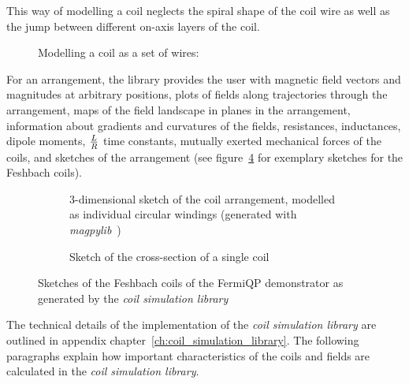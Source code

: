 This way of modelling a coil neglects the spiral shape of the coil wire as well as the jump between different on-axis layers of the coil.

\begin{figure}
    \caption{Modelling a coil as a set of wires:
    }
    \label{fig:coil_model}
\end{figure}

For an arrangement, the library provides the user with magnetic field vectors and magnitudes at arbitrary positions, plots of fields along trajectories through the arrangement, maps of the field landscape in planes in the arrangement, information about gradients and curvatures of the fields, resistances, inductances, dipole moments, $L\over R$ time constants, mutually exerted mechanical forces of the coils, and sketches of the arrangement (see figure~\ref{fig:csl_sketches} for exemplary sketches for the Feshbach coils).

\begin{figure}
    \centering
    \begin{subfigure}[t]{0.47\textwidth}
        \centering
        \resizebox{\textwidth}{!}{
            \begin{pgfpicture}
                \pgftext{}
            \end{pgfpicture}
        }
        \caption{3-dimensional sketch of the coil arrangement, modelled as individual circular windings (generated with \textit{magpylib}~\cite{noauthor_magpylibmagpylib_2022})}
        \label{fig:csl_sketches_3d}
    \end{subfigure}
    \hspace{0.04\textwidth}
    \begin{subfigure}[t]{0.47\textwidth}
        \centering
        \resizebox{\textwidth}{!}{
            \begin{pgfpicture}
                \pgftext{}
            \end{pgfpicture}
        }
        \caption{Sketch of the cross-section of a single coil}
        \label{fig:csl_sketches_cross_section}
    \end{subfigure}
    \caption{Sketches of the Feshbach coils of the FermiQP demonstrator as generated by the \textit{coil simulation library}}
    \label{fig:csl_sketches}
\end{figure}

The technical details of the implementation of the \textit{coil simulation library} are outlined in appendix chapter~\ref{ch:coil_simulation_library}. The following paragraphs explain how important characteristics of the coils and fields are calculated in the \textit{coil simulation library}.

